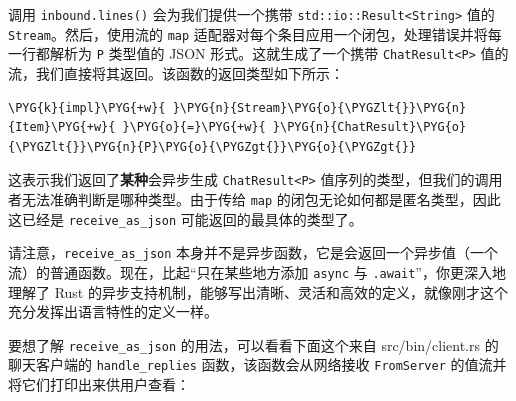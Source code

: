 调用 \texttt{inbound.lines()} 会为我们提供一个携带 \texttt{std::io::Result<String>} 值的 \texttt{Stream}。然后，使用流的 \texttt{map} 适配器对每个条目应用一个闭包，处理错误并将每一行都解析为 \texttt{P} 类型值的 JSON 形式。这就生成了一个携带 \texttt{ChatResult<P>} 值的流，我们直接将其返回。该函数的返回类型如下所示：

\begin{Verbatim}[commandchars=\\\{\},breaklines=true,breakanywhere=true,fontsize=\codefont,xleftmargin=17bp]
\PYG{k}{impl}\PYG{+w}{ }\PYG{n}{Stream}\PYG{o}{\PYGZlt{}}\PYG{n}{Item}\PYG{+w}{ }\PYG{o}{=}\PYG{+w}{ }\PYG{n}{ChatResult}\PYG{o}{\PYGZlt{}}\PYG{n}{P}\PYG{o}{\PYGZgt{}}\PYG{o}{\PYGZgt{}}
\end{Verbatim}

这表示我们返回了\textbf{某种}会异步生成 \texttt{ChatResult<P>} 值序列的类型，但我们的调用者无法准确判断是哪种类型。由于传给 \texttt{map} 的闭包无论如何都是匿名类型，因此这已经是 \texttt{receive\_as\_json} 可能返回的最具体的类型了。

请注意，\texttt{receive\_as\_json} 本身并不是异步函数，它是会返回一个异步值（一个流）的普通函数。现在，比起“只在某些地方添加 \texttt{async} 与 \texttt{.await}”，你更深入地理解了 Rust 的异步支持机制，能够写出清晰、灵活和高效的定义，就像刚才这个充分发挥出语言特性的定义一样。

要想了解 \texttt{receive\_as\_json} 的用法，可以看看下面这个来自 src/bin/client.rs 的聊天客户端的 \texttt{handle\_replies} 函数，该函数会从网络接收 \texttt{FromServer} 的值流并将它们打印出来供用户查看：

